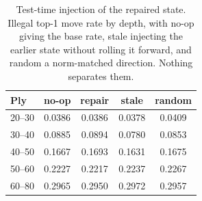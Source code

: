 \begin{table}[t]
\centering\small
\caption{Test-time injection of the repaired state. Illegal top-1
move rate by depth, with no-op giving the base rate, stale injecting
the earlier state without rolling it forward, and random a
norm-matched direction. Nothing separates them.}
\label{tab:repair}
\begin{tabular}{lcccc}
\toprule
Ply & no-op & repair & stale & random \\
\midrule
20--30 & 0.0386 & 0.0386 & 0.0378 & 0.0409 \\
30--40 & 0.0885 & 0.0894 & 0.0780 & 0.0853 \\
40--50 & 0.1667 & 0.1693 & 0.1631 & 0.1675 \\
50--60 & 0.2227 & 0.2217 & 0.2237 & 0.2267 \\
60--80 & 0.2965 & 0.2950 & 0.2972 & 0.2957 \\
\bottomrule
\end{tabular}
\end{table}
